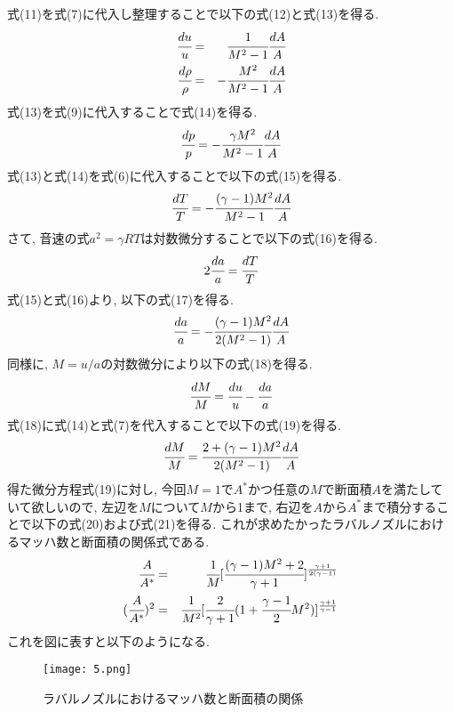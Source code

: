 \documentclass[12pt]{jsarticle}
\begin{document}
式(11)を式(7)に代入し整理することで以下の式(12)と式(13)を得る.
\begin{eqnarray}
\cfrac{du}{u} &=& \cfrac{1}{M^2 -1}\cfrac{dA}{A} \\
\cfrac{d\rho}{\rho} &=& - \cfrac{M^2}{M^2 -1}\cfrac{dA}{A}
\end{eqnarray}
式(13)を式(9)に代入することで式(14)を得る.
\begin{eqnarray}
\cfrac{dp}{p} = -\cfrac{\gamma M^2}{M^2 -1}\cfrac{dA}{A}
\end{eqnarray}
式(13)と式(14)を式(6)に代入することで以下の式(15)を得る.
\begin{eqnarray}
\cfrac{dT}{T} = -\cfrac{(\gamma -1) M^2}{M^2 -1}\cfrac{dA}{A}
\end{eqnarray}
さて, 音速の式$a^2 =\gamma RT$は対数微分することで以下の式(16)を得る.
\begin{eqnarray}
2\cfrac{da}{a} = \cfrac{dT}{T}
\end{eqnarray}
式(15)と式(16)より, 以下の式(17)を得る.
\begin{eqnarray}
\cfrac{da}{a} = -\cfrac{(\gamma -1) M^2}{2(M^2 -1)}\cfrac{dA}{A}
\end{eqnarray}
同様に, $M=u/a$の対数微分により以下の式(18)を得る.
\begin{eqnarray}
\cfrac{dM}{M} = \cfrac{du}{u} - \cfrac{da}{a}
\end{eqnarray}
式(18)に式(14)と式(7)を代入することで以下の式(19)を得る.
\begin{eqnarray}
\cfrac{dM}{M} = \cfrac{2+(\gamma -1) M^2}{2(M^2 -1)}\cfrac{dA}{A}
\end{eqnarray}
得た微分方程式(19)に対し, 今回$M=1$で$A^{\ast}$かつ任意の$M$で断面積$A$を満たしていて欲しいので, 左辺を$M$について$M$から1まで, 右辺を$A$から$A^{\ast}$まで積分することで以下の式(20)および式(21)を得る. これが求めたかったラバルノズルにおけるマッハ数と断面積の関係式である.
\begin{eqnarray}
\cfrac{A}{A^{\ast}} &=& \cfrac{1}{M}[\cfrac{(\gamma -1)M^2 + 2}{\gamma +1}]^{\frac{\gamma +1}{2(\gamma -1)}} \\
(\cfrac{A}{A^{\ast}})^2 &=& \cfrac{1}{M^2}[\cfrac{2}{\gamma +1}(1+\cfrac{\gamma -1}{2}M^2)]^{\frac{\gamma +1}{\gamma -1}}
\end{eqnarray}
これを図に表すと以下のようになる.
\begin{figure}[htbp]
\begin{center}
\texttt{[image: 5.png]}
\caption{ラバルノズルにおけるマッハ数と断面積の関係}
\end{center}
\end{figure} \newpage \noindent
\end{document}
